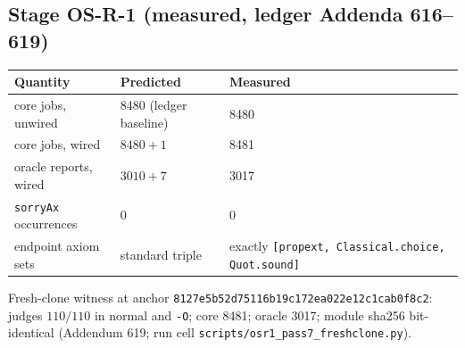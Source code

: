 \documentclass[11pt]{article}
\newcommand{\lean}[1]{\texttt{#1}}
\begin{document}
\subsection*{Stage OS-R-1 (measured, ledger Addenda 616--619)}
\begin{center}
\begin{tabular}{lll}
\textbf{Quantity} & \textbf{Predicted} & \textbf{Measured} \\ \hline
core jobs, unwired & 8480 (ledger baseline) & 8480 \\
core jobs, wired & $8480+1$ & 8481 \\
oracle reports, wired & $3010+7$ & 3017 \\
\lean{sorryAx} occurrences & 0 & 0 \\
endpoint axiom sets & standard triple & exactly
\lean{[propext, Classical.choice, Quot.sound]} \\
\end{tabular}
\end{center}
Fresh-clone witness at anchor
\lean{8127e5b52d75116b19c172ea022e12c1cab0f8c2}: judges $110/110$ in
normal and \lean{-O}; core 8481; oracle 3017; module sha256
bit-identical (Addendum 619; run cell
\lean{scripts/osr1\_pass7\_freshclone.py}).
\end{document}
